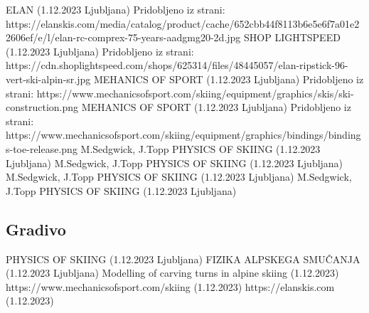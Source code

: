 \documentclass{article}
\begin{document}
\begin{thebibliography}{20}
     ELAN (1.12.2023 Ljubljana) Pridobljeno iz strani: https://elanskis.com/media/catalog/product/cache/652cbb44f8113b6e5e6f7a01e22606ef/e/l/elan-rc-comprex-75-years-aadgmg20-2d.jpg
     SHOP LIGHTSPEED (1.12.2023 Ljubljana) Pridobljeno iz strani: https://cdn.shoplightspeed.com/shops/625314/files/48445057/elan-ripstick-96-vert-ski-alpin-sr.jpg
     MEHANICS OF SPORT (1.12.2023 Ljubljana) Pridobljeno iz strani: https://www.mechanicsofsport.com/skiing/equipment/graphics/skis/ski-construction.png
     MEHANICS OF SPORT (1.12.2023 Ljubljana) Pridobljeno iz strani: https://www.mechanicsofsport.com/skiing/equipment/graphics/bindings/bindings-toe-release.png
     M.Sedgwick, J.Topp PHYSICS OF SKIING (1.12.2023 Ljubljana)
     M.Sedgwick, J.Topp PHYSICS OF SKIING (1.12.2023 Ljubljana)
     M.Sedgwick, J.Topp PHYSICS OF SKIING (1.12.2023 Ljubljana)
     M.Sedgwick, J.Topp PHYSICS OF SKIING (1.12.2023 Ljubljana)
\end{thebibliography}

\subsection{Gradivo}

\begin{thebibliography}{widestlabel}
     PHYSICS OF SKIING (1.12.2023 Ljubljana)
    \bibitem[P.Fakin]{} FIZIKA ALPSKEGA SMUČANJA (1.12.2023 Ljubljana)
     Modelling of carving turns in alpine skiing (1.12.2023)
     https://www.mechanicsofsport.com/skiing (1.12.2023)
    \bibitem[ELAN]{}  https://elanskis.com (1.12.2023)
    
\end{thebibliography}
\end{document}
